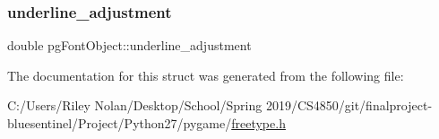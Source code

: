 \mbox{\label{structpg_font_object_a3d76b1e36c49d1bcc25d7f9bf03ef936}} 
\subsubsection{\texorpdfstring{underline\_adjustment}{underline\_adjustment}}
{\footnotesize\ttfamily double pg\+Font\+Object\+::underline\+\_\+adjustment}



The documentation for this struct was generated from the following file\+:\begin{DoxyCompactItemize}
\item 
C\+:/\+Users/\+Riley Nolan/\+Desktop/\+School/\+Spring 2019/\+C\+S4850/git/finalproject-\/bluesentinel/\+Project/\+Python27/pygame/\mbox{\hyperlink{freetype_8h}{freetype.\+h}}\end{DoxyCompactItemize}
